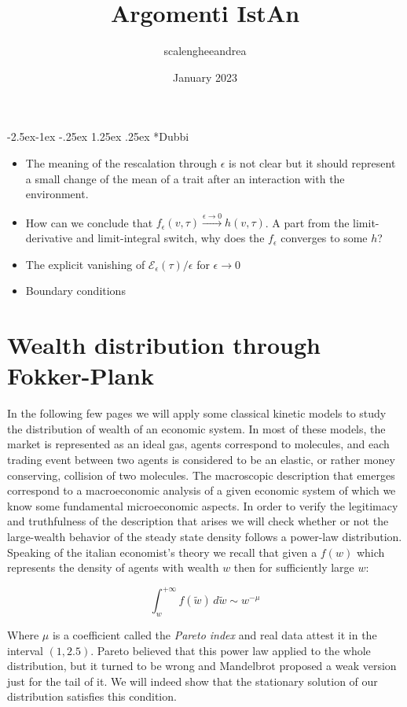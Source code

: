 \documentclass[12pt,a4paper]{article}
\title{Argomenti IstAn}
\author{scalengheeandrea }
\date{January 2023}
\makeatletter
\renewcommand\paragraph{\@startsection{paragraph}{0}{\z@}%
            {-2.5ex\@plus -1ex \@minus -.25ex}%
            {1.25ex \@plus .25ex}%
            {\normalfont\normalsize\bfseries}}
\numberwithin{theorem}{section}
\numberwithin{definition}{section}
\numberwithin{example}{section}
\numberwithin{exercise}{section}
\makeatother
\begin{document}
\paragraph*{Dubbi}


\nocite{Cordier_2005}
\printbibliography

\begin{itemize}
    \item The meaning of the rescalation through $\epsilon$ is not clear but it should represent a small change of the mean of a trait after an interaction with the environment. 
    \item How can we conclude that $f_{\epsilon}(v,\tau)\xrightarrow{\epsilon\to0}h(v,\tau)$. A part from the limit-derivative and limit-integral switch, why does the $f_{\epsilon}$ converges to some $h$?
    \item The explicit vanishing of $\mathcal{E}_{\epsilon}(\tau)/\epsilon$ for $\epsilon\to0$
    \item Boundary conditions
\end{itemize}

\section*{Wealth distribution through Fokker-Plank}

 In the following few pages we will apply some classical kinetic models to study the distribution of wealth of an economic system. In most of these models, the market is represented as an ideal gas, agents correspond to molecules, and each trading event between two agents is considered to be an elastic, or rather money conserving, collision of two molecules. The macroscopic description that emerges correspond to a macroeconomic analysis of a given economic system of which we know some fundamental microeconomic aspects. In order to verify the legitimacy and truthfulness of the description that arises we will check whether or not the large-wealth behavior of the steady state density follows a power-law distribution. Speaking of the italian economist's theory we recall that given a $f(w)$ which represents the density of agents with wealth $w$ then for sufficiently large $w$:

 \[\int_w^{+\infty}f(\tilde{w}) \,d\tilde{w} \sim w^{-\mu}\]

Where $\mu$ is a coefficient called the \textit{Pareto index} and real data attest it in the interval $(1,2.5)$. Pareto believed that this power law applied to the whole distribution, but it turned to be wrong and Mandelbrot proposed a weak version just for the tail of it. We will indeed show that the stationary solution of our distribution satisfies this condition.
\end{document}
